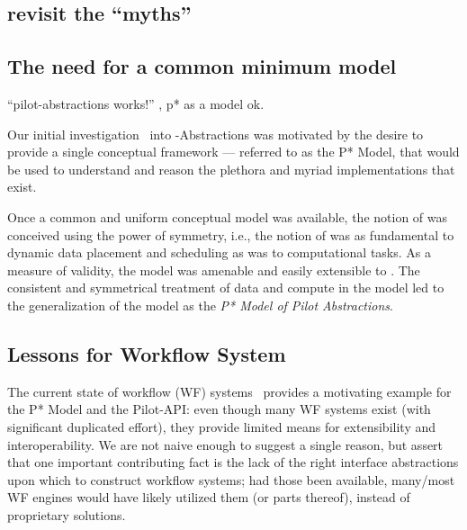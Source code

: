 \documentclass{sig-alternate}
\begin{document}



\subsection{revisit the ``myths''}

\subsection{The need for a common minimum model}

``pilot-abstractions works!'' , p* as a model ok.


Our initial investigation~\cite{Luckow:2008la} into
\pilot-Abstractions was motivated by the desire to provide a single
conceptual framework --- referred to as the P* Model, that would be
used to understand and reason the plethora and myriad \pilotjob
implementations that exist.


Once a common and uniform conceptual model was available, the notion
of \pilotdata was conceived using the power of symmetry, i.e., the
notion of \pilotdata was as fundamental to dynamic data placement and
scheduling as \pilotjobs was to computational tasks. As a measure of
validity, the \pstar model was amenable and easily extensible to
\pilotdata.  The consistent and symmetrical treatment of data and
compute in the model led to the generalization of the model as the
{\it P* Model of Pilot Abstractions}.


\subsection{Lessons for Workflow System}

The current state of workflow (WF) systems~\cite{nsf-workflow,1196459}
provides a motivating example for the P* Model and the Pilot-API: even
though many WF systems exist (with significant duplicated effort),
they provide limited means for extensibility and interoperability.  We
are not naive enough to suggest a single reason, but assert that one
important contributing fact is the lack of the right interface
abstractions upon which to construct workflow systems; had those been
available, many/most WF engines would have likely utilized them (or
parts thereof), instead of proprietary solutions.
\end{document}

